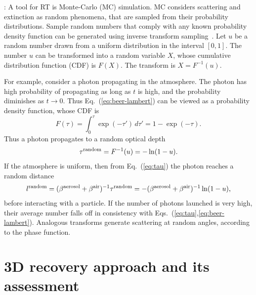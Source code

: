 \documentclass[10pt,letterpaper]{article}
\newcommand{\derivsym}[1]{\,d{#1}}
\begin{document}
: A tool for RT is
Monte-Carlo (MC) simulation. MC considers scattering and extinction as
random phenomena, that are sampled from their probability
distributions.  Sample random numbers that comply with any known
probability density function can be generated using inverse transform
sampling~\cite{devroye1986sample}. Let $u$ be a random number drawn
from a uniform distribution in the interval $[0,1]$. The number $u$
can be transformed into a random variable $X$, whose cumulative
distribution function (CDF) is $F(X)$. The transform is $X =
F^{-1}(u)$.

For example, consider a photon propagating in the atmosphere.  The
photon has high probability of propagating as long as $t$ is high, and
the probability diminishes as $t\rightarrow 0$. Thus
Eq.~(\ref{eq:beer-lambert}) can be viewed as a probability density
function, whose CDF is
\begin{equation}
  \label{eq:Ftau}
  F(\tau)=\int_{0}^{\tau}\exp(-\tau')\derivsym{\tau'}=1-\exp(-\tau).
\end{equation}
Thus a photon propagates to a random optical depth
\begin{equation}
  \label{eq:taurand}
  \tau^{\rm random}=F^{-1}(u)=-\ln(1-u).
\end{equation}
If the atmosphere is uniform, then from Eq.~(\ref{eq:tau}) the photon
reaches a random distance
\begin{equation}
  \label{eq:lrand}
  l^{\rm random}= (\beta^{\rm aerosol}+\beta^{\rm air})^{-1} \tau^{\rm random}
  = -(\beta^{\rm aerosol}+\beta^{\rm air})^{-1}\ln(1-u),
\end{equation}
before interacting with a particle. If the number of photons launched
is very high, their average number falls off in consistency with
Eqs.~(\ref{eq:tau},\ref{eq:beer-lambert}).  Analogous transforms
generate scattering at random angles, according to the phase function.


\section{3D recovery approach and its assessment}
\label{sec:methodology}
\end{document}

